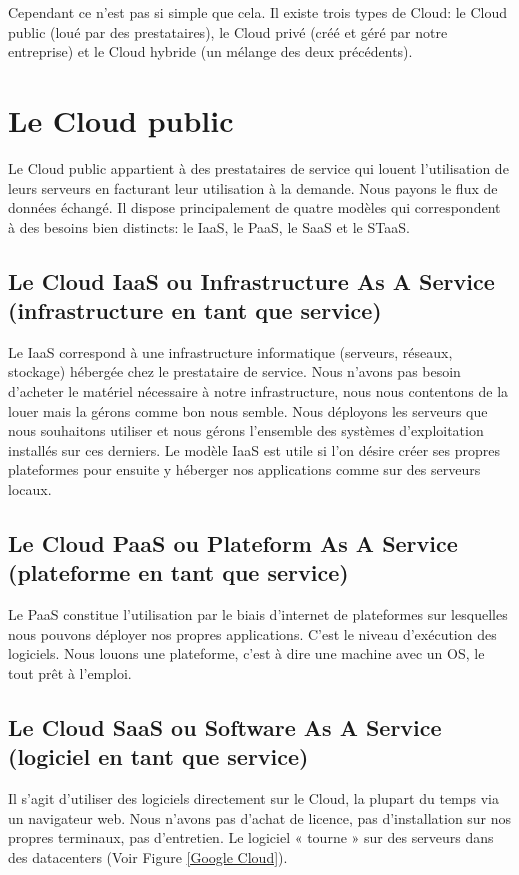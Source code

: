   Cependant ce n’est pas si simple que cela. Il existe trois types de Cloud: le Cloud public (loué par des prestataires), le Cloud privé (créé et géré par notre entreprise) et le Cloud hybride (un mélange des deux précédents).

  \section{Le Cloud public}
  Le Cloud public appartient à des prestataires de service qui louent l’utilisation de leurs serveurs en facturant leur utilisation à la demande. Nous payons le flux de données échangé. Il dispose principalement de quatre modèles qui correspondent à des besoins bien distincts: le IaaS, le PaaS, le SaaS et le STaaS.

    \subsection{Le Cloud IaaS ou Infrastructure As A Service (infrastructure en tant que service)}
    Le IaaS correspond à une infrastructure informatique (serveurs, réseaux, stockage) hébergée chez le prestataire de service. Nous n’avons pas besoin d’acheter le matériel nécessaire à notre infrastructure, nous nous contentons de la louer mais la gérons comme bon nous semble. Nous déployons les serveurs que nous souhaitons utiliser et nous gérons l’ensemble des systèmes d'exploitation installés sur ces derniers. Le modèle IaaS est utile si l’on désire créer ses propres plateformes pour ensuite y héberger nos applications comme sur des serveurs locaux.

    \subsection{Le Cloud PaaS ou Plateform As A Service (plateforme en tant que service)}
    Le PaaS constitue l’utilisation par le biais d’internet de plateformes sur lesquelles nous pouvons déployer nos propres applications. C’est le niveau d’exécution des logiciels. Nous louons une plateforme, c’est à dire une machine avec un OS, le tout prêt à l’emploi.

    \subsection{Le Cloud SaaS ou Software As A Service (logiciel en tant que service)}
    Il s’agit d’utiliser des logiciels directement sur le Cloud, la plupart du temps via un navigateur web. Nous n’avons pas d’achat de licence, pas d’installation sur nos propres terminaux, pas d’entretien. Le logiciel « tourne » sur des serveurs dans des datacenters (Voir Figure \ref{Google Cloud}).


